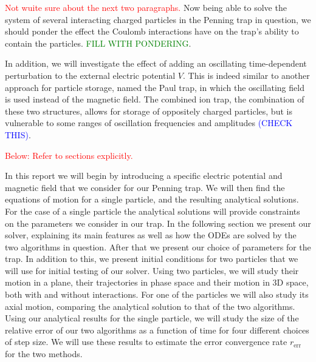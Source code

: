 \textcolor{red}{Not wuite sure about the next two paragraphs.}
Now being able to solve the system of several interacting charged particles in the Penning trap in question, we should ponder the effect the Coulomb interactions have on the trap's ability to contain the particles. 
\textcolor{green}{FILL WITH PONDERING}. 

In addition, we will investigate the effect of adding an oscillating time-dependent perturbation to the external electric potential $V$. This is indeed similar to another approach for particle storage, named the Paul trap, in which the oscillating field is used instead of the magnetic field. The combined ion trap, the combination of these two structures, allows for storage of oppositely charged particles, but is vulnerable to some ranges of oscillation frequencies and amplitudes \textcolor{blue}{(CHECK THIS)}.

\textcolor{red}{Below: Refer to sections explicitly.}

In this report we will begin by introducing a specific electric potential and magnetic field that we consider for our Penning trap. We will then find the equations of motion for a single particle, and the resulting analytical solutions. For the case of a single particle the analytical solutions will provide constraints on the parameters we consider in our trap. In the following section we present our solver, explaining its main features as well as how the ODEs are solved by the two algorithms in question. After that we present our choice of parameters for the trap. In addition to this, we present initial conditions for two particles that we will use for initial testing of our solver. Using two particles, we will study their motion in a plane, their trajectories in phase space and their motion in 3D space, both with and without interactions. For one of the particles we will also study its axial motion, comparing the analytical solution to that of the two algorithms. Using our analytical results for the single particle, we will study the size of the relative error of our two algorithms as a function of time for four different choices of step size. We will use these results to estimate the error convergence rate $r_\mathrm{err}$ for the two methods. 


